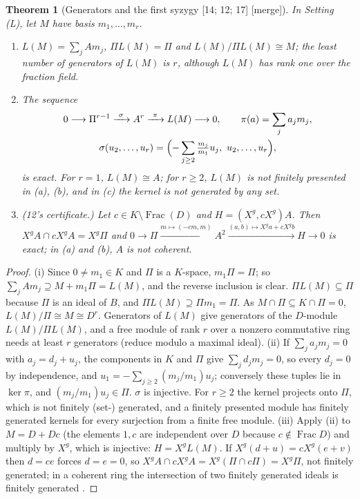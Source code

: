 \documentclass[11pt,letterpaper]{article}
\numberwithin{equation}{section}
\newtheorem{theorem}{Theorem}[section]
\theoremstyle{definition}
\theoremstyle{remark}
\theoremstyle{plain}
\newcommand{\Frac}{\operatorname{Frac}}
\newcommand{\src}[1]{\textup{\textsf{[#1]}}}
\newcommand{\merge}{\textup{\textsf{[merge]}}}
\begin{document}
\begin{theorem}[Generators and the first syzygy \src{14; 12; 17} \merge]\label{osq:tn:thm:syzygy}
In Setting (L), let $M$ have basis $m_1,\dots,m_r$.
\begin{enumerate}
\item $L(M)=\sum_jAm_j$, $\Pi L(M)=\Pi$ and $L(M)/\Pi L(M)\cong M$; the least number of generators of $L(M)$ is $r$,
although $L(M)$ has rank one over the fraction field.
\item The sequence
\begin{gather*}
 0\longrightarrow\Pi^{r-1}\xrightarrow{\ \sigma\ }A^r\xrightarrow{\ \pi\ }L(M)\longrightarrow0,\qquad
 \pi(a)=\sum_ja_jm_j,\\
 \sigma(u_2,\dots,u_r)=\Bigl(-\sum_{j\ge2}\tfrac{m_j}{m_1}u_j,\ u_2,\dots,u_r\Bigr),
\end{gather*}
is exact. For $r=1$, $L(M)\cong A$; for $r\ge2$, $L(M)$ is not finitely presented in (a), (b), and in (c) the kernel is
not generated by any set.
\item \emph{(12's certificate.)} Let $c\in K\setminus\Frac(D)$ and $H=(X^g,cX^g)A$. Then
$X^gA\cap cX^gA=X^g\Pi$ and $0\to\Pi\xrightarrow{m\mapsto(-cm,m)}A^2\xrightarrow{(a,b)\mapsto X^ga+cX^gb}H\to0$ is
exact; in (a) and (b), $A$ is not coherent.
\end{enumerate}
\end{theorem}
\begin{proof}
(i) Since $0\ne m_1\in K$ and $\Pi$ is a $K$-space, $m_1\Pi=\Pi$; so $\sum_jAm_j\supseteq M+m_1\Pi=L(M)$, and the
reverse inclusion is clear. $\Pi L(M)\subseteq\Pi$ because $\Pi$ is an ideal of $B$, and $\Pi L(M)\supseteq\Pi m_1=\Pi$.
As $M\cap\Pi\subseteq K\cap\Pi=0$, $L(M)/\Pi\cong M\cong D^r$. Generators of $L(M)$ give generators of the $D$-module
$L(M)/\Pi L(M)$, and a free module of rank $r$ over a nonzero commutative ring needs at least $r$ generators (reduce
modulo a maximal ideal).
(ii) If $\sum_ja_jm_j=0$ with $a_j=d_j+u_j$, the components in $K$ and $\Pi$ give $\sum_jd_jm_j=0$, so every $d_j=0$
by independence, and $u_1=-\sum_{j\ge2}(m_j/m_1)u_j$; conversely these tuples lie in $\ker\pi$, and $(m_j/m_1)u_j\in\Pi$.
$\sigma$ is injective. For $r\ge2$ the kernel projects onto $\Pi$, which is not finitely (set-) generated, and a
finitely presented module has finitely generated kernels for every surjection from a finite free module.
(iii) Apply (ii) to $M=D+Dc$ (the elements $1,c$ are independent over $D$ because $c\notin\Frac D$) and multiply by
$X^g$, which is injective: $H=X^gL(M)$. If $X^g(d+u)=cX^g(e+v)$ then $d=ce$ forces $d=e=0$, so
$X^gA\cap cX^gA=X^g(\Pi\cap c\Pi)=X^g\Pi$, not finitely generated; in a coherent ring the intersection of two finitely
generated ideals is finitely generated \cite[Tag~05CU]{StacksCoherent}.
\end{proof}
\end{document}
